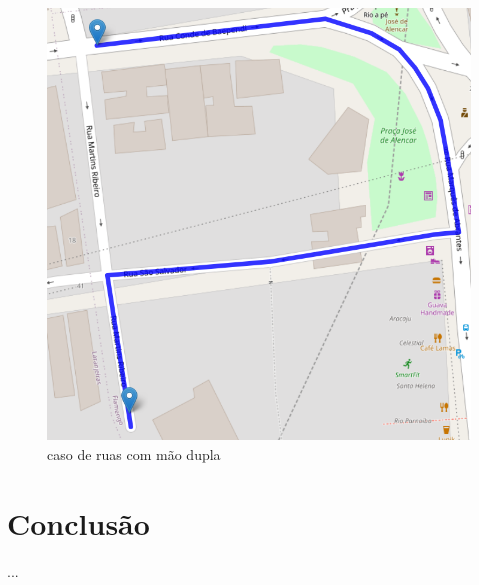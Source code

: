 \documentclass{article}
\begin{document}
\begin{figure}[H]
    \centering
    \includegraphics[scale=0.5]{EDAreport-two-way-street-bug.png}
    \caption{caso de ruas com mão dupla}
    \label{fig:my_label}
\end{figure}

\subsubsection{}

\section{Conclusão}
...
\end{document}

